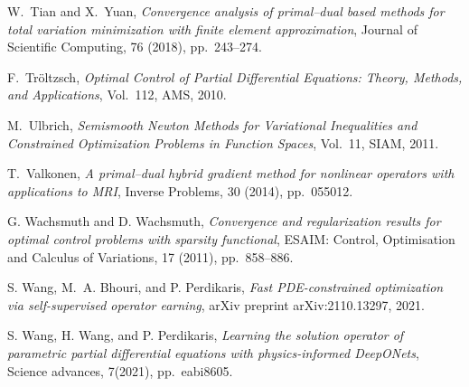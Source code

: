 \documentclass[final]{siamart171218}
\theoremstyle{remark}
\begin{document}
\begin{thebibliography}{10}
	
	{ W.~Tian and X.~Yuan}, {\em Convergence analysis of primal--dual based
		methods for total variation minimization with finite element approximation},
	Journal of Scientific Computing, 76 (2018), pp.~243--274.
	
	
	{ F.~Tr{\"o}ltzsch}, {\em Optimal Control of Partial Differential Equations:
		Theory, Methods, and Applications}, Vol.~112, AMS,
	2010.
	
	{ M.~Ulbrich}, {\em Semismooth Newton Methods for Variational Inequalities and Constrained Optimization Problems in Function Spaces}, Vol.~11, SIAM, 2011.
	
	
	{ T.~Valkonen}, {\em A primal--dual hybrid gradient method for nonlinear
		operators with applications to MRI}, Inverse Problems, 30 (2014), pp.~055012.
	
	{ G. Wachsmuth and D. Wachsmuth}, {\em Convergence and regularization results for optimal control problems with sparsity functional}, ESAIM: Control, Optimisation and Calculus of Variations, 17 (2011), pp.~858--886.
	
	{S. Wang, M.~A. Bhouri, and P. Perdikaris,} {\em Fast PDE-constrained optimization via self-supervised operator earning}, arXiv preprint arXiv:2110.13297, 2021.
	
	S. Wang, H. Wang, and P. Perdikaris, {\em Learning the solution operator of parametric partial differential equations with physics-informed DeepONets}, Science advances, 7(2021), pp.~eabi8605.



\end{thebibliography}
\end{document}
